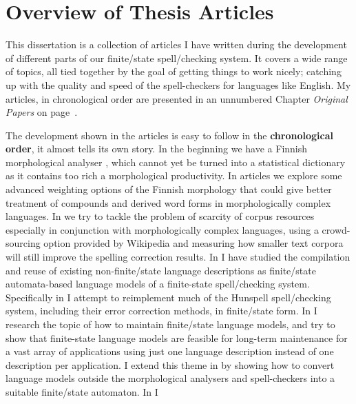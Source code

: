 \documentclass[officiallayout]{unihelcompling}
\begin{document}
\section{Overview of Thesis Articles}
\label{sec:articles}

This dissertation is a collection of articles I have written during the
development of different parts of our finite\-/state spell\-/checking system. It
covers a wide range of topics, all tied together by the goal of getting things
to work nicely; catching up with the quality and speed of the spell-checkers
for languages like English. My articles, in chronological order are presented
in an unnumbered Chapter \emph{Original Papers} on page~\pageref{chap:papers}.

The development shown in the articles is easy to follow in the
\textbf{chronological order}, it almost tells its own story. In the beginning
we have a Finnish morphological analyser \citep{pirinen2008suomen}, which
cannot yet be turned into a statistical dictionary as it contains too rich a
morphological productivity. In articles
 we explore some advanced
weighting options of the Finnish morphology that could give better treatment of
compounds and derived word forms in morphologically complex languages. In
 we try to tackle the problem of scarcity of
corpus resources especially in conjunction with morphologically complex
languages, using a crowd-sourcing option provided by Wikipedia and measuring
how smaller text corpora will still improve the spelling correction results. In
 I have studied the
compilation and reuse of existing non-finite\-/state language descriptions as
finite\-/state automata-based language models of a finite-state spell\-/checking
system.  Specifically in  I attempt to
reimplement much of the Hunspell spell\-/checking system, including their error
correction methods, in finite\-/state form. In
 I research the topic of how to maintain
finite\-/state language models, and try to show that finite-state language models
are feasible for long-term maintenance for a vast array of applications using
just one language description instead of one description per application.  I
extend this theme in  by showing how to
convert language models outside the morphological analysers and spell-checkers
into a suitable finite\-/state automaton. In  I
\end{document}
